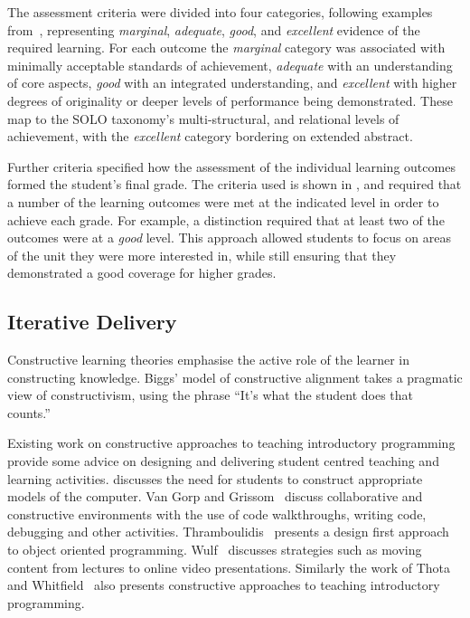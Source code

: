 The assessment criteria were divided into four categories, following examples from~\cite{Biggs:2007}, representing \emph{marginal}, \emph{adequate}, \emph{good}, and \emph{excellent} evidence of the required learning. For each outcome the \emph{marginal} category was associated with minimally acceptable standards of achievement, \emph{adequate} with an understanding of core aspects, \emph{good} with an integrated understanding, and \emph{excellent} with higher degrees of originality or deeper levels of performance being demonstrated. These map to the SOLO taxonomy's multi-structural, and relational levels of achievement, with the \emph{excellent} category bordering on extended abstract.

Further criteria specified how the assessment of the individual learning outcomes formed the student's final grade. The criteria used is shown in , and required that a number of the learning outcomes were met at the indicated level in order to achieve each grade. For example, a distinction required that at least two of the outcomes were at a \emph{good} level. This approach allowed students to focus on areas of the unit they were more interested in, while still ensuring that they demonstrated a good coverage for higher grades.


\subsection{Iterative Delivery} %
\label{sub:iterative_delivery}

Constructive learning theories emphasise the active role of the learner in constructing knowledge. Biggs' model of constructive alignment takes a pragmatic view of constructivism, using the phrase ``It's what the student does that counts.''~\cite{Biggs:1996c} %

Existing work on constructive approaches to teaching introductory programming provide some advice on designing and delivering student centred teaching and learning activities. \citet{BenAri:1998,BenAri:2001} discusses the need for students to construct appropriate models of the computer. Van Gorp and Grissom~\cite{VanGorp:2001} discuss collaborative and constructive environments with the use of code walkthroughs, writing code, debugging and other activities. Thramboulidis~\cite{Thramboulidis:2003a} presents a design first approach to object oriented programming. Wulf~\cite{Wulf:2005} discusses strategies such as moving content from lectures to online video presentations. Similarly the work of Thota and Whitfield~\cite{Thota:2010} also presents constructive approaches to teaching introductory programming.

